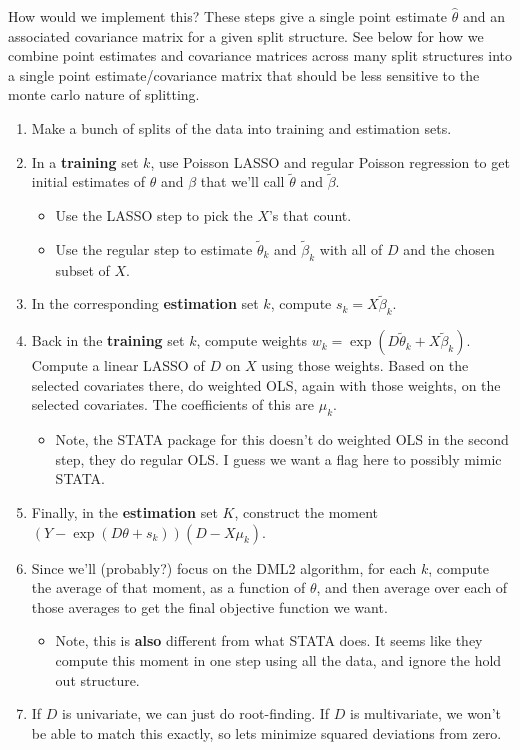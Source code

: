 \documentclass[11pt]{article}
\begin{document}
How would we implement this?  These steps give a single point estimate $\widehat{\theta}$ and an associated covariance matrix for a given split structure.  See below for how we combine point estimates and covariance matrices across many split structures into a single point estimate/covariance matrix that should be less sensitive to the monte carlo nature of splitting.
\begin{enumerate}
	\item Make a bunch of splits of the data into training and estimation sets. 
	\item In a \textbf{training} set $k$, use Poisson LASSO and regular Poisson regression to get initial estimates of $\theta$ and $\beta$ that we'll call $\widetilde{\theta}$ and $\widetilde{\beta}$.
		\begin{itemize}
			\item Use the LASSO step to pick the $X$'s that count.
			\item Use the regular step to estimate $\widetilde{\theta}_k$ and $\widetilde{\beta}_k$ with all of $D$ and the chosen subset of $X$.
		\end{itemize}
	\item In the corresponding \textbf{estimation} set $k$, compute $s_k = X \widetilde{\beta}_k$.
	\item Back in the \textbf{training} set $k$, compute weights $w_k = \exp(D\widetilde{\theta}_k + X\widetilde{\beta}_k)$.  Compute a linear LASSO of $D$ on $X$ using those weights.  Based on the selected covariates there, do weighted OLS, again with those weights, on the selected covariates.  The coefficients of this are $\mu_k$.
		\begin{itemize}
			\item Note, the STATA package for this doesn't do weighted OLS in the second step, they do regular OLS.  I guess we want a flag here to possibly mimic STATA.
		\end{itemize}
	\item Finally, in the \textbf{estimation} set $K$, construct the moment $(Y - \exp(D\theta + s_k))(D - X\mu_k)$.
	\item Since we'll (probably?) focus on the DML2 algorithm, for each $k$, compute the average of that moment, as a function of $\theta$, and then average over each of those averages to get the final objective function we want.
		\begin{itemize}
			\item Note, this is \textbf{also} different from what STATA does.  It seems like they compute this moment in one step using all the data, and ignore the hold out structure.
		\end{itemize}
	\item If $D$ is univariate, we can just do root-finding.  If $D$ is multivariate, we won't be able to match this exactly, so lets minimize squared deviations from zero.   
\end{enumerate}
\end{document}
